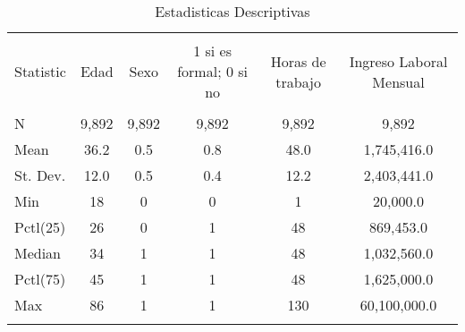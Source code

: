
\begin{table}[!htbp] \centering 
  \caption{Estadisticas Descriptivas} 
  \label{} 
\begin{tabular}{@{\extracolsep{5pt}}lccccc} 
\\[-1.8ex]\hline 
\hline \\[-1.8ex] 
Statistic & Edad & Sexo & 1 si es formal; 0 si no & Horas de trabajo & Ingreso Laboral Mensual \\ 
\hline \\[-1.8ex] 
N & 9,892 & 9,892 & 9,892 & 9,892 & 9,892 \\ 
Mean & 36.2 & 0.5 & 0.8 & 48.0 & 1,745,416.0 \\ 
St. Dev. & 12.0 & 0.5 & 0.4 & 12.2 & 2,403,441.0 \\ 
Min & 18 & 0 & 0 & 1 & 20,000.0 \\ 
Pctl(25) & 26 & 0 & 1 & 48 & 869,453.0 \\ 
Median & 34 & 1 & 1 & 48 & 1,032,560.0 \\ 
Pctl(75) & 45 & 1 & 1 & 48 & 1,625,000.0 \\ 
Max & 86 & 1 & 1 & 130 & 60,100,000.0 \\ 
\hline \\[-1.8ex] 
\end{tabular} 
\end{table} 

